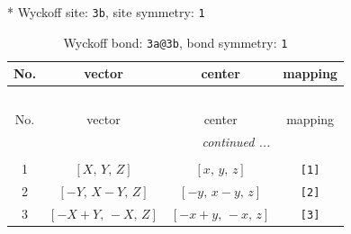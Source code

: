\documentclass[fleqn,8pt]{jsarticle}
\begin{document}
* Wyckoff site: {\tt 3b}, site symmetry: {\tt 1}
\renewcommand{\arraystretch}{1.2}
\begin{longtable}{cccc}
\caption{Wyckoff bond: {\tt 3a@3b}, bond symmetry: {\tt 1}}
 \\
 \hline \hline
No. & vector & center & mapping \\ \hline \endfirsthead

\multicolumn{3}{l}{\tablename\ \thetable{}} \\
 \hline \hline
No. & vector & center & mapping \\ \hline \endhead

 \hline \hline
\multicolumn{3}{r}{\footnotesize\it continued ...} \\ \endfoot

 \hline \hline
\multicolumn{3}{r}{} \\ \endlastfoot

1 & $\left[ X,\, Y,\, Z \right]$ & $\left[ x,\, y,\, z \right]$ & {\tt [1]} \\ \hline
2 & $\left[ - Y,\, X - Y,\, Z \right]$ & $\left[ - y,\, x - y,\, z \right]$ & {\tt [2]} \\ \hline
3 & $\left[ - X + Y,\, - X,\, Z \right]$ & $\left[ - x + y,\, - x,\, z \right]$ & {\tt [3]} \\
\end{longtable}
\end{document}
